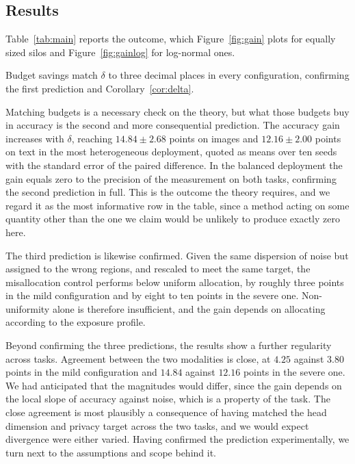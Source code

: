 \documentclass[acmsmall,screen,review,anonymous]{acmart}
\theoremstyle{acmdefinition}%
\begin{document}
\subsection{Results}

Table~\ref{tab:main} reports the outcome, which Figure~\ref{fig:gain} plots for
equally sized silos and Figure~\ref{fig:gainlog} for log-normal ones.

Budget savings match $\delta$ to three decimal places in every configuration,
confirming the first prediction and Corollary~\ref{cor:delta}.

Matching budgets is a necessary check on the theory, but what those budgets buy in accuracy is the second and more consequential prediction. The accuracy gain increases with $\delta$, reaching $14.84 \pm 2.68$ points on
images and $12.16 \pm 2.00$ points on text in the most heterogeneous deployment,
quoted as means over ten seeds with the standard error of the paired difference.
In the balanced deployment the gain equals zero to the
precision of the measurement on both tasks, confirming the second prediction in full. This is the outcome the theory
requires, and we regard it as the most informative row in the table, since a
method acting on some quantity other than the one we claim would be unlikely to
produce exactly zero here.

The third prediction is likewise confirmed. Given the same dispersion of noise
but assigned to the wrong regions, and rescaled to meet the same target, the
misallocation control performs below uniform allocation, by roughly three points
in the mild configuration and by eight to ten points in the severe one. Non-uniformity alone is therefore
insufficient, and the gain depends on allocating according to the exposure
profile.

Beyond confirming the three predictions, the results show a further regularity across tasks. Agreement between the two modalities is close, at $4.25$ against $3.80$ points in
the mild configuration and $14.84$ against $12.16$ points in the severe one. We had anticipated that the magnitudes would
differ, since the gain depends on the local slope of accuracy against noise, which
is a property of the task. The close agreement is most plausibly a consequence of
having matched the head dimension and privacy target across the two tasks, and we
would expect divergence were either varied. Having confirmed the prediction
experimentally, we turn next to the assumptions and scope behind it.
\end{document}
